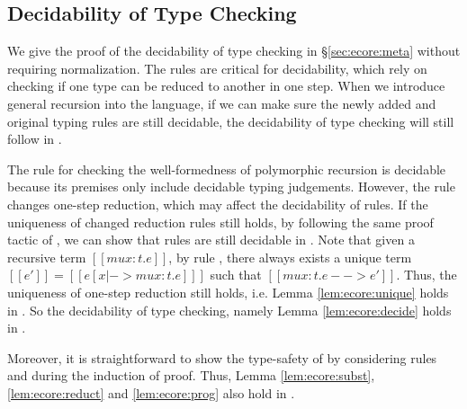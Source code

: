 \subsection{Decidability of Type Checking}
We give the proof of the decidability of type checking \ecore in \S \ref{sec:ecore:meta} without requiring normalization. The \cast rules are critical for decidability, which rely on checking if one type can be reduced to another in one step. When we introduce general recursion into the language, if we can make sure the newly added and original typing rules are still decidable, the decidability of type checking will still follow in \name.

The rule  for checking the well-formedness of polymorphic recursion is decidable because its premises only include decidable typing judgements. However, the rule  changes one-step reduction, which may affect the decidability of \cast rules. If the uniqueness of changed reduction rules still holds, by following the same proof tactic of \ecore, we can show that \cast rules are still decidable in \name. Note that given a recursive term $[[mu x:t.e]]$, by rule , there always exists a unique term $[[e']]=[[e[x|->mu x:t.e] ]]$ such that $[[mu x:t.e --> e']]$. Thus, the uniqueness of one-step reduction still holds, i.e. Lemma \ref{lem:ecore:unique} holds in \name. So the decidability of type checking, namely Lemma \ref{lem:ecore:decide} holds in \name.

Moreover, it is straightforward to show the type-safety of \name by considering rules  and  during the induction of proof. Thus, Lemma \ref{lem:ecore:subst}, \ref{lem:ecore:reduct} and \ref{lem:ecore:prog} also hold in \name.
